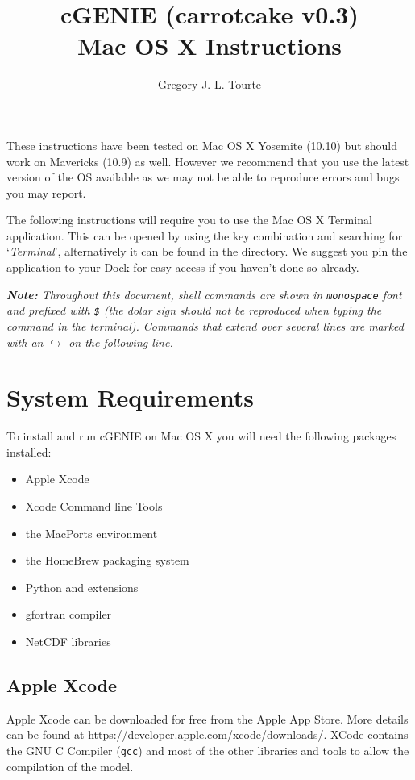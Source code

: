 \documentclass{scrartcl}
\title{cGENIE (carrotcake v0.3)\\
Mac OS X Instructions}
\author{Gregory J. L. Tourte}
\begin{document}
\maketitle

These instructions have been tested on Mac OS X Yosemite (10.10) but should
work on Mavericks (10.9) as well. However we recommend that you use the latest
version of the OS available as we may not be able to reproduce errors and bugs
you may report.

The following instructions will require you to use the Mac OS X Terminal
application. This can be opened by using the \keys{\cmd+\SPACE} key combination
and searching for `\textit{Terminal}', alternatively it can be found in the
 directory. We suggest you pin
the application to your Dock for easy access if you haven't done so already.

{\itshape \textbf{Note:} Throughout this document, shell commands are shown in
\textup{\texttt{monospace}} font and prefixed with \textup{\texttt{\$}} (the
dolar sign should not be reproduced when typing the command in the terminal).
Commands that extend over several lines are marked with an
{\tiny\ensuremath{\hookrightarrow}} on the following line.}

\section{System Requirements}

To install and run cGENIE on Mac OS X you will need the following packages
installed:

\begin{itemize}
	\item Apple Xcode
	\item Xcode Command line Tools
	\item the MacPorts environment
	\item the HomeBrew packaging system 
	\item Python and extensions
	\item gfortran compiler 
	\item NetCDF libraries
\end{itemize}

\subsection{Apple Xcode}

Apple Xcode can be downloaded for free from the Apple App Store. More details
can be found at \url{https://developer.apple.com/xcode/downloads/}. XCode
contains the GNU C Compiler (\texttt{gcc}) and most of the other libraries and
tools to allow the compilation of the model.
\end{document}
